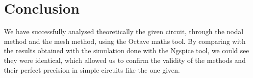 \section{Conclusion}
\label{sec:conclusion}

We have successfully analysed theoretically the given circuit, through the nodal method and the mesh method, using the Octave maths tool. By comparing with the results obtained with the simulation done with the Ngspice tool, we could see they were identical, which allowed us to confirm the validity of the methods and their perfect precision in simple circuits like the one given. 

